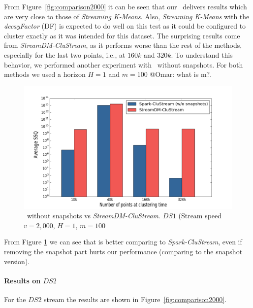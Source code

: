 From Figure~\ref{fig:comparison2000} it can be seen that our \our~delivers results which are very close to those of \textit{Streaming K-Means}. Also, \textit{Streaming K-Means} with the \textit{decayFactor} (DF) is expected to do well on this test as it could be configured to cluster exactly as it was intended for this dataset. 
The surprising results come from \textit{StreamDM-CluStream}, as it performs worse than the rest of the methods, especially for the last two points, i.e.,  at $160k$ and $320k$.
To understand this behavior, we performed another experiment with \our~without snapshots. For both methods we used a horizon $H = 1$ and $m=100$ \color{red}@Omar: what is m?\color{black}.
\begin{figure}[h]
 \centering
 \includegraphics[scale=0.35]{./styles/comparisonNoSnaps.png}
 \caption{\our~without snapshots vs \textit{StreamDM-CluStream}. $DS1$ (Stream speed $v=2,000$, $H=1$, $m=100$} 	
 \label{fig:comparisonNoSnaps}
\end{figure}
From Figure \ref{fig:comparisonNoSnaps} we can see that \our is better comparing to \textit{Spark-CluStream}, even if removing the snapshot part hurts our performance (comparing to the snapshot version).

\paragraph{Results on $DS2$}
For the $DS2$ stream the results are shown in Figure~\ref{fig:comparison2000}.

